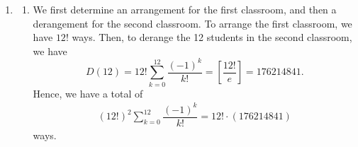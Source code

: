 \documentclass[12pt]{article}
\begin{document}
\begin{enumerate}
\begin{enumerate}
      \item We can use the fact that
        \begin{align*}
          L_2 &= S_0 - E_1 - E_0 \\
          &= S_0 - \left(S_1 - {2 \choose 1}S_2 + {3 \choose 1}S_3 -
          {4 \choose 1}S_4\right) \\ &- \left(S_0 - S_1 + S_2 - S_3 +
          S_4\right) \\
          &= S_2 - 2S_3 + 3S_4.
        \end{align*}
        Using our values for $S_k$ in the previous question, we get
        \begin{align*}
          L_2 &= {4 \choose 2} \cdot \dfrac{9!}{(2!)^2   } - 2\cdot
          {4 \choose 3} \cdot \dfrac{8!}{2!} + 3 \cdot 7! \\
          &= 544320 - 161280 + 15120 \\
          &= 398160
        \end{align*}
        total ways to have at least two pairs of consecutive identical letters.
    \end{enumerate}

  \item
    \begin{enumerate}
      \item We first determine an arrangement for the first
        classroom, and then a derangement for the second classroom.
        To arrange the first classroom, we have $12!$ ways. Then, to
        derange the 12 students in the second classroom, we have
        $$D(12) = 12! \sum_{k = 0}^{12}\dfrac{(-1)^k}{k!} =
        \left[\dfrac{12!}{e}\right] = 176214841.$$ Hence, we have a total of
        \begin{align*}
          (12!)^2 \sum_{k = 0}^{12}\dfrac{(-1)^k}{k!} = 12! \cdot (176214841)
        \end{align*} ways.


\end{enumerate}
\end{enumerate}
\end{document}

